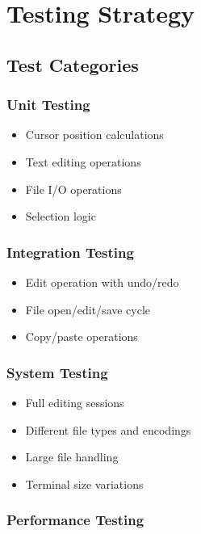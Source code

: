 \documentclass[12pt,a4paper,oneside,openany]{report}
\begin{document}
\chapter{Testing Strategy}

\section{Test Categories}

\subsection{Unit Testing}

\begin{itemize}
	\item Cursor position calculations
	\item Text editing operations
	\item File I/O operations
	\item Selection logic
\end{itemize}

\subsection{Integration Testing}

\begin{itemize}
	\item Edit operation with undo/redo
	\item File open/edit/save cycle
	\item Copy/paste operations
\end{itemize}

\subsection{System Testing}

\begin{itemize}
	\item Full editing sessions
	\item Different file types and encodings
	\item Large file handling
	\item Terminal size variations
\end{itemize}

\subsection{Performance Testing}
\end{document}
